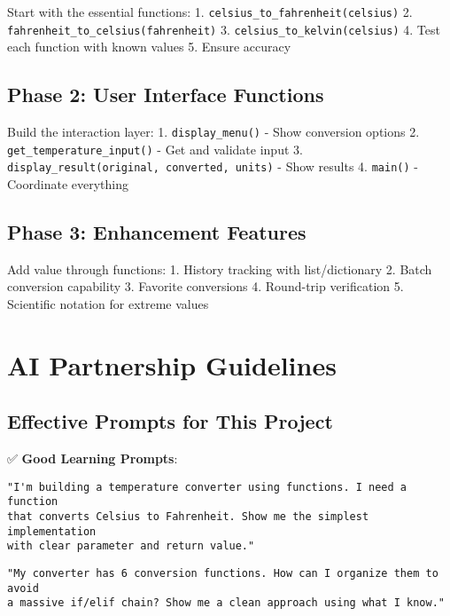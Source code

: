\documentclass[
  letterpaper,
  DIV=11,
  numbers=noendperiod,
  oneside]{scrreprt}
\begin{document}
Start with the essential functions: 1.
\texttt{celsius\_to\_fahrenheit(celsius)} 2.
\texttt{fahrenheit\_to\_celsius(fahrenheit)} 3.
\texttt{celsius\_to\_kelvin(celsius)} 4. Test each function with known
values 5. Ensure accuracy

\subsection{Phase 2: User Interface
Functions}\label{phase-2-user-interface-functions}

Build the interaction layer: 1. \texttt{display\_menu()} - Show
conversion options 2. \texttt{get\_temperature\_input()} - Get and
validate input 3. \texttt{display\_result(original,\ converted,\ units)}
- Show results 4. \texttt{main()} - Coordinate everything

\subsection{Phase 3: Enhancement
Features}\label{phase-3-enhancement-features}

Add value through functions: 1. History tracking with list/dictionary 2.
Batch conversion capability 3. Favorite conversions 4. Round-trip
verification 5. Scientific notation for extreme values

\section{AI Partnership Guidelines}\label{ai-partnership-guidelines-4}

\subsection{Effective Prompts for This
Project}\label{effective-prompts-for-this-project-4}

✅ \textbf{Good Learning Prompts}:

\begin{verbatim}
"I'm building a temperature converter using functions. I need a function 
that converts Celsius to Fahrenheit. Show me the simplest implementation 
with clear parameter and return value."
\end{verbatim}

\begin{verbatim}
"My converter has 6 conversion functions. How can I organize them to avoid 
a massive if/elif chain? Show me a clean approach using what I know."
\end{verbatim}
\end{document}
